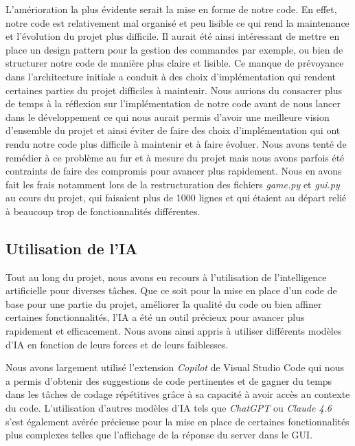 \documentclass[11pt]{article}
\begin{document}
L'amérioration la plus évidente serait la mise en forme de notre code. En effet, notre code est relativement mal organisé et peu lisible ce qui rend la maintenance et l'évolution du projet plus difficile.
Il aurait été ainsi intéressant de mettre en place un design pattern pour la gestion des commandes par exemple, ou bien de structurer notre code de manière plus claire et lisible.
Ce manque de prévoyance dans l’architecture initiale a conduit à des choix d’implémentation qui rendent certaines parties du projet difficiles à maintenir.
Nous aurions du consacrer plus de temps à la réflexion sur l'implémentation de notre code avant de nous lancer dans le développement ce qui nous aurait permis d'avoir une meilleure vision d'ensemble du projet et ainsi éviter de faire des choix d'implémentation qui ont rendu notre code plus difficile à maintenir et à faire évoluer.
Nous avons tenté de remédier à ce problème au fur et à mesure du projet mais nous avons parfois été contraints de faire des compromis pour avancer plus rapidement.
Nous en avons fait les frais notamment lors de la restructuration des fichiers \textit{game.py} et \textit{gui.py} au cours du projet, qui faisaient plus de 1000 lignes et qui étaient au départ relié à beaucoup trop de fonctionnalités différentes.



\subsection{Utilisation de l'IA}

Tout au long du projet, nous avons eu recours à l'utilisation de l'intelligence artificielle pour diverses tâches.
Que ce soit pour la mise en place d'un code de base pour une partie du projet, améliorer la qualité du code ou bien affiner certaines fonctionnalités, l'IA a été un outil précieux pour avancer plus rapidement et efficacement.
Nous avons ainsi appris à utiliser différents modèles d'IA en fonction de leurs forces et de leurs faiblesses.

Nous avons largement utilisé l'extension \textit{Copilot} de Visual Studio Code qui nous a permis d'obtenir des suggestions de code pertinentes et de gagner du temps dans les tâches de codage répétitives grâce à sa capacité à avoir accès au contexte du code.
L'utilisation d'autres modèles d'IA tels que \textit{ChatGPT} ou \textit{Claude 4.6} s'est également avérée précieuse pour la mise en place de certaines fonctionnalités plus complexes telles que l'affichage de la réponse du server dans le GUI.
\end{document}
